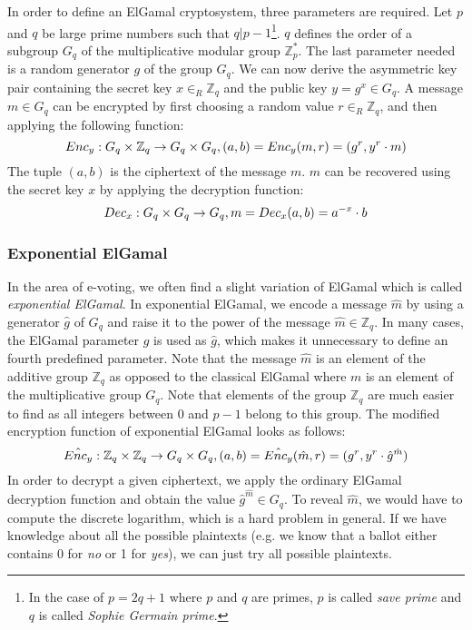 \documentclass[numbers=noenddot, abstract=on, a4paper, headsepline,
footsepline, oneside, draft=off]{scrreprt}
\begin{document}
In order to define an ElGamal cryptosystem, three parameters are required. Let
$p$ and $q$ be large prime numbers such that $q|p-1$\footnote{In the case of
$p=2q+1$ where $p$ and $q$ are primes, $p$ is called \emph{save prime} and $q$
is called \emph{Sophie Germain prime}.}.
$q$ defines the order of a subgroup $G_q$ of the multiplicative modular group
$\mathbb{Z}^*_p$. The last parameter needed is a random generator $g$ of the
group $G_q$. We can now derive the asymmetric key pair containing the secret key
$x \in_R \mathbb{Z}_q$ and the public key $y=g^x \in G_q$. A message $m \in G_q$
can be encrypted by first choosing a random value $r \in_R \mathbb{Z}_q$, and
then applying the following function:
\begin{equation}
Enc_y : G_q \times \mathbb{Z}_q \rightarrow G_q \times G_q,
(a, b)=Enc_y(m, r)=(g^r, y^r \cdot m) \notag
\end{equation}
The tuple $(a, b)$ is the ciphertext of the message $m$. $m$ can be recovered using the secret key $x$
by applying the decryption function:
\begin{equation}
Dec_x : G_q \times G_q \rightarrow G_q,
m=Dec_x(a, b)=a^{-x} \cdot b \notag
\end{equation}

\subsubsection{Exponential ElGamal}
\label{sec:expelgamal}
In the area of e-voting, we often find a slight variation of ElGamal which is
called \emph{exponential ElGamal}. In exponential ElGamal, we encode a message
$\hat{m}$ by using a generator $\hat{g}$ of $G_q$ and raise it to
the power of the message $\hat{m} \in \mathbb{Z}_q$. In many cases, the
ElGamal parameter $g$ is used as $\hat{g}$, which makes it unnecessary to
define an fourth predefined parameter. Note that the message $\hat{m}$ is an
element of the additive group $\mathbb{Z}_q$ as opposed to the classical
ElGamal where $m$ is an element of the multiplicative group $G_q$. Note that
elements of the group $\mathbb{Z}_q$ are much easier to find as all integers
between $0$ and $p-1$ belong to this group. The modified encryption function of
exponential ElGamal looks as follows:
\begin{equation}
\hat{Enc_y} : \mathbb{Z}_q \times \mathbb{Z}_q \rightarrow G_q \times G_q,
(a, b)=\hat{Enc_y}(\hat{m}, r)=(g^r, y^r \cdot \hat{g}^{\hat{m}}) \notag
\end{equation}
In order to decrypt a given ciphertext, we apply the ordinary ElGamal decryption
function and obtain the value $\hat{g}^{\hat{m}} \in G_q$. To reveal $\hat{m}$,
we would have to compute the discrete logarithm, which is a hard problem in
general. If we have knowledge about all the possible plaintexts (e.g. we know
that a ballot either contains 0 for \emph{no} or 1 for \emph{yes}), we can just try all
possible plaintexts. 
\end{document}
